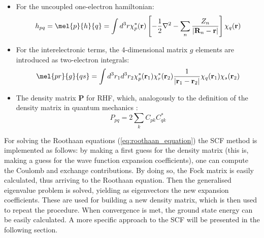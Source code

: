 \begin{itemize}
\item For the uncoupled one-electron hamiltonian:
\begin{equation}
	h_{pq}=\mel{p}{h}{q}=\int{d^3r \chi_p^*(\mathbf{r})\left[-\frac{1}{2}\nabla^2-\sum_n\frac{Z_n}{\left|\mathbf{R}_n-\mathbf{r}\right|}\right]\chi_q(\mathbf{r})}
	\label{eq:h_matrix}
\end{equation}

\item For the interelectronic terms, the 4-dimensional matrix $g$ elements are introduced as two-electron integrals:
\begin{equation}
	\mel{pr}{g}{qs}=\int{d^3r_1 d^3r_2 \chi_p^*(\mathbf{r}_1)\chi_r^*(\mathbf{r}_2)\frac{1}{\left|\mathbf{r}_1-\mathbf{r}_2\right|}\chi_q(\mathbf{r}_1)\chi_s(\mathbf{r}_2)}
	\label{eq:g_matrix}
\end{equation}

\item The density matrix $\mathbf{P}$ for RHF, which, analogously to the definition of the density matrix in quantum mechanics \cite{densitymatrix}:
\begin{equation}
	P_{pq} = 2\sum_{k}C_{pk}C_{qk}^*
	\label{eq:density_matrix}
\end{equation}
\end{itemize}
For solving the Roothaan equations (\ref{eq:roothaan_equation}) the SCF method is implemented as follows: by making a first guess for the density matrix (this is, making a guess for the wave function expansion coefficients), one can compute the Coulomb and exchange contributions. By doing so, the Fock matrix is easily calculated, thus arriving to the Roothaan equation. Then the generalised eigenvalue problem is solved, yielding as eigenvectors the new expansion coefficients. These are used for building a new density matrix, which is then used to repeat the procedure. When convergence is met, the ground state energy can be easily calculated. A more specific approach to the SCF will be presented in the following section.%
